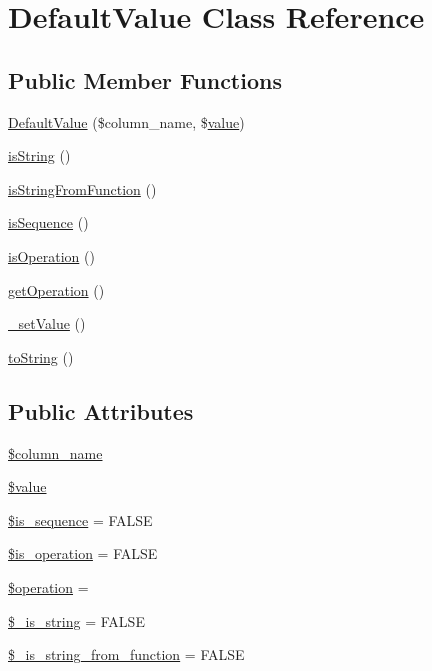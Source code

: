 \hypertarget{classDefaultValue}{}\section{Default\+Value Class Reference}
\label{classDefaultValue}
\subsection*{Public Member Functions}
\begin{DoxyCompactItemize}
\item 
\hyperlink{classDefaultValue_a738994d0f9563b86310d85ede30c2fc7}{Default\+Value} (\$column\+\_\+name, \$\hyperlink{jquery_8js_abe5393d870043cf6aaa1d5ad5fce755c}{value})
\item 
\hyperlink{classDefaultValue_a2ff17e887cf955aea26fbb1b3e11f491}{is\+String} ()
\item 
\hyperlink{classDefaultValue_aeef8c65be1e3cfe7459916653d6d9181}{is\+String\+From\+Function} ()
\item 
\hyperlink{classDefaultValue_a5186ba40cadb8a1740edd64665f4c126}{is\+Sequence} ()
\item 
\hyperlink{classDefaultValue_af7a051370a3b8bb17d9f9cf64a03be74}{is\+Operation} ()
\item 
\hyperlink{classDefaultValue_a1e607abe2e29a00fa3ab0cecba406776}{get\+Operation} ()
\item 
\hyperlink{classDefaultValue_a1a0d50d43f32dbb3df7e11467c6938be}{\+\_\+set\+Value} ()
\item 
\hyperlink{classDefaultValue_a0f0d4d1cc64b3bfb8d2acec2b113be4d}{to\+String} ()
\end{DoxyCompactItemize}
\subsection*{Public Attributes}
\begin{DoxyCompactItemize}
\item 
\hyperlink{classDefaultValue_a671e32e797e9975b6497a56a5ba92dc6}{\$column\+\_\+name}
\item 
\hyperlink{classDefaultValue_a963ea764e6dfb5dbfe87c4b8ffd131ac}{\$value}
\item 
\hyperlink{classDefaultValue_a7ad2c3e04c79053b6299c0fa0e35389e}{\$is\+\_\+sequence} = F\+A\+L\+SE
\item 
\hyperlink{classDefaultValue_ae01855465814b8be26de7bd0b33b6778}{\$is\+\_\+operation} = F\+A\+L\+SE
\item 
\hyperlink{classDefaultValue_a0b0e52103637bbb5ea0fdedcb0672fcd}{\$operation} = \textquotesingle{}\textquotesingle{}
\item 
\hyperlink{classDefaultValue_ac3b23483d015be5b48517fb96890b64a}{\$\+\_\+is\+\_\+string} = F\+A\+L\+SE
\item 
\hyperlink{classDefaultValue_a000cf284b962d5c3354abd73b611c888}{\$\+\_\+is\+\_\+string\+\_\+from\+\_\+function} = F\+A\+L\+SE
\end{DoxyCompactItemize}


